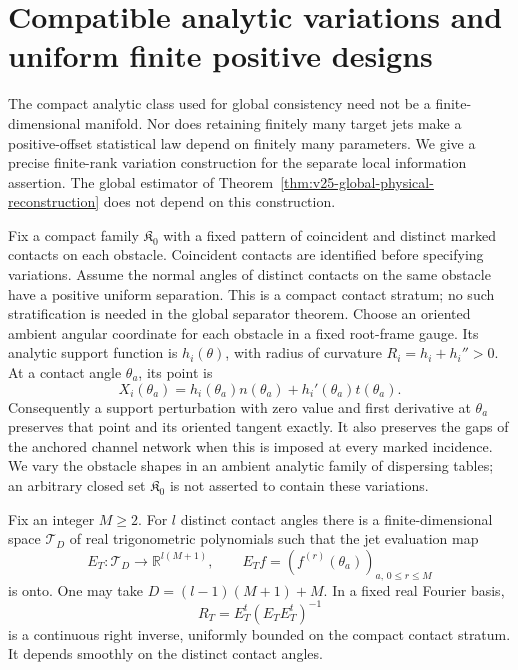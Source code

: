 \section{Compatible analytic variations and uniform finite positive designs}
\label{sec:v25-analytic-variation-bundle}

The compact analytic class used for global consistency need not be a
finite-dimensional manifold.  Nor does retaining finitely many target jets
make a positive-offset statistical law depend on finitely many parameters.
We give a precise finite-rank variation construction for the separate local
information assertion.  The global estimator of
Theorem~\ref{thm:v25-global-physical-reconstruction} does not depend on this
construction.

Fix a compact family \(\mathfrak K_0\) with a fixed pattern of coincident
and distinct marked contacts on each obstacle.  Coincident contacts are
identified before specifying variations.  Assume the normal angles of
distinct contacts on the same obstacle have a positive uniform separation.
This is a compact contact stratum; no such stratification is needed in the
global separator theorem.  Choose an oriented ambient angular coordinate for
each obstacle in a fixed root-frame gauge.  Its analytic support function is
\(h_i(\theta)\), with radius of curvature
\(R_i=h_i+h_i''>0\).  At a contact angle \(\theta_a\), its point is
\[
       X_i(\theta_a)=h_i(\theta_a)n(\theta_a)
                               +h_i'(\theta_a)t(\theta_a).
\]
Consequently a support perturbation with zero value and first derivative at
\(\theta_a\) preserves that point and its oriented tangent exactly.
It also preserves the gaps of the anchored channel network when this is
imposed at every marked incidence.  We vary the obstacle shapes in an ambient
analytic family of dispersing tables; an arbitrary closed set
\(\mathfrak K_0\) is not asserted to contain these variations.

\begin{lemma}
\label{lem:v25-hermite-right-inverse}
Fix an integer \(M\ge2\).  For \(l\) distinct contact angles there is a
finite-dimensional space \(\mathscr T_D\) of real trigonometric polynomials
such that the jet evaluation map
\[
 E_T:\mathscr T_D\longrightarrow\mathbb R^{l(M+1)},\qquad
 E_T f=(f^{(r)}(\theta_a))_{a,\,0\le r\le M}
\]
is onto.  One may take \(D=(l-1)(M+1)+M\).  In a fixed real Fourier basis,
\begin{equation}\label{eq:v25-hermite-inverse}
                         R_T=E_T^t(E_TE_T^t)^{-1}
\end{equation}
is a continuous right inverse, uniformly bounded on the compact contact
stratum.  It depends smoothly on the distinct contact angles.
\end{lemma}

